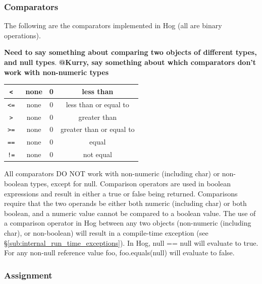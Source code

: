 \documentclass{article}
\begin{document}

\subsubsection{Comparators} %
\label{ssub:comparators}

The following are the comparators implemented in Hog (all are binary operations).

\textbf{Need to say something about comparing two objects of different types, and
null types}. \textbf{@Kurry, say something about which comparators don't work with non-numeric types}

\begin{center}
\begin{tabular}{|c|c|c|c|}

\hline
\tt < \rm & none & 0 & less than \\ \hline
\tt <= \rm & none & 0 & less than or equal to \\ \hline
\tt > \rm & none & 0 & greater than \\ \hline
\tt >= \rm & none & 0 & greater than or equal to \\ \hline
\tt == \rm & none & 0 & equal \\ \hline
\tt != \rm & none & 0 & not equal \\ \hline

\end{tabular}
\end{center}

All comparators DO NOT work with non-numeric (including char) or non-boolean
types, except for null. Comparison operators are used in boolean expressions
and result in either a true or false being returned. Comparisons require that
the two operands be either both numeric (including char) or both boolean, and
a numeric value cannot be compared to a boolean value. The use of a comparison
operator in Hog between any two objects (non-numeric (including char), or non-boolean)
will result in a compile-time exception (see \S \ref{sub:internal_run_time_exceptions}).
In Hog, null == null will evaluate to true. For any non-null reference value foo, foo.equals(null)
will evaluate to false.


\subsubsection{Assignment} %
\label{ssub:assignment}
\end{document}
